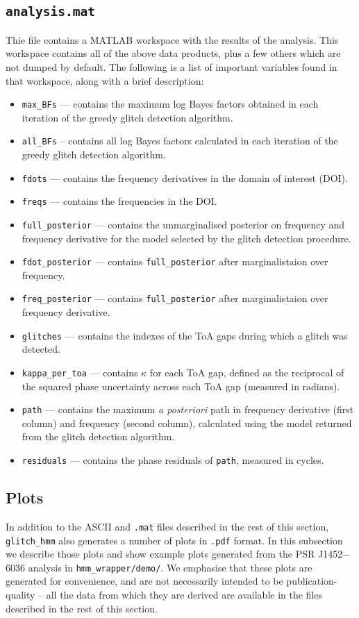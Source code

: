 \documentclass{article}
\newcommand{\glitchhmm}{\texttt{glitch\_hmm}}
\begin{document}
\subsection{\texttt{analysis.mat}}
Thie file contains a MATLAB workspace with the results of the analysis. 
This workspace contains all of the above data products, plus a few others which are not dumped by default.
The following is a list of important variables found in that workspace, along with a brief description:
\begin{itemize}
    \item \texttt{max\_BFs} --- contains the maximum log Bayes factors obtained in each iteration of the greedy glitch detection algorithm.
    \item \texttt{all\_BFs} -- contains all log Bayes factors calculated in each iteration of the greedy glitch detection algorithm.
    \item \texttt{fdots} --- contains the frequency derivatives in the domain of interest (DOI).
    \item \texttt{freqs} --- contains the frequencies in the DOI.
    \item \texttt{full\_posterior} --- contains the unmarginalised posterior on frequency and frequency derivative for the model selected by the glitch detection procedure.
    \item \texttt{fdot\_posterior} --- contains \texttt{full\_posterior} after marginalistaion over frequency.
    \item \texttt{freq\_posterior} --- contains \texttt{full\_posterior} after marginalistaion over frequency derivative.
    \item \texttt{glitches} --- contains the indexes of the ToA gaps during which a glitch was detected.
    \item \texttt{kappa\_per\_toa} --- contains $\kappa$ for each ToA gap, defined as the reciprocal of the squared phase uncertainty across each ToA gap (measured in radians).
    \item \texttt{path} --- contains the maximum \emph{a posteriori} path in frequency derivative (first column) and frequency (second column), calculated using the model returned from the glitch detection algorithm.
    \item \texttt{residuals} --- contains the phase residuals of \texttt{path}, measured in cycles.
\end{itemize}

\subsection{Plots}
In addition to the ASCII and \texttt{.mat} files described in the rest of this section, \glitchhmm{} also generates a number of plots in \texttt{.pdf} format.
In this subsection we describe those plots and show example plots generated from the PSR J1452$-$6036 analysis in \texttt{hmm\_wrapper/demo/}.
We emphasise that these plots are generated for convenience, and are not necessarily intended to be publication-quality -- all the data from which they are derived are available in the files described in the rest of this section.
\end{document}
